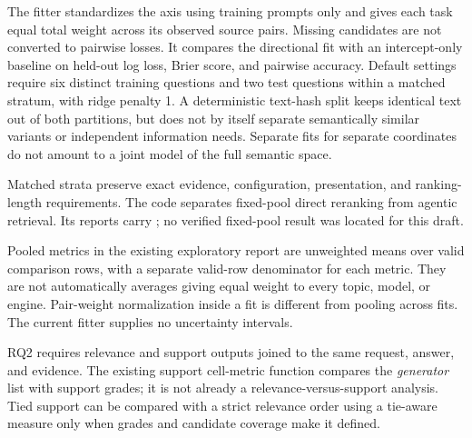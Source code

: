 The fitter standardizes the axis using training prompts only and gives each task equal total weight across its observed source pairs. Missing candidates are not converted to pairwise losses. It compares the directional fit with an intercept-only baseline on held-out log loss, Brier score, and pairwise accuracy. Default settings require six distinct training questions and two test questions within a matched stratum, with ridge penalty 1. A deterministic text-hash split keeps identical text out of both partitions, but does not by itself separate semantically similar variants or independent information needs. Separate fits for separate coordinates do not amount to a joint model of the full semantic space.

Matched strata preserve exact evidence, configuration, presentation, and ranking-length requirements. The code separates fixed-pool direct reranking from agentic retrieval. Its reports carry ; no verified fixed-pool result was located for this draft. 

Pooled metrics in the existing exploratory report are unweighted means over valid comparison rows, with a separate valid-row denominator for each metric. They are not automatically averages giving equal weight to every topic, model, or engine. Pair-weight normalization inside a fit is different from pooling across fits. The current fitter supplies no uncertainty intervals. 

RQ2 requires relevance and support outputs joined to the same request, answer, and evidence. The existing support cell-metric function compares the \emph{generator} list with support grades; it is not already a relevance-versus-support analysis. Tied support can be compared with a strict relevance order using a tie-aware measure only when grades and candidate coverage make it defined. 
